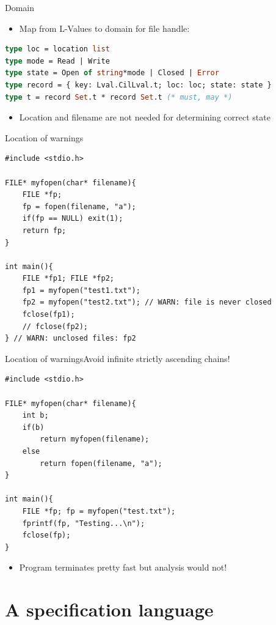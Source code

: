 \documentclass{beamer}
\begin{document}
\begin{frame}[fragile]{Domain}
\begin{itemize}
\item Map from L-Values to domain for file handle:
\end{itemize}
\begin{lstlisting}[language=ML]
type loc = location list
type mode = Read | Write
type state = Open of string*mode | Closed | Error
type record = { key: Lval.CilLval.t; loc: loc; state: state }
type t = record Set.t * record Set.t (* must, may *)
\end{lstlisting}
\begin{itemize}
\item Location and filename are not needed for determining correct state
\end{itemize}
\end{frame}

\begin{frame}[fragile]{Location of warnings}
\begin{lstlisting}
#include <stdio.h>

FILE* myfopen(char* filename){
    FILE *fp;
    fp = fopen(filename, "a");
    if(fp == NULL) exit(1);
    return fp;
}

int main(){
    FILE *fp1; FILE *fp2;
    fp1 = myfopen("test1.txt");
    fp2 = myfopen("test2.txt"); // WARN: file is never closed
    fclose(fp1);
    // fclose(fp2);
} // WARN: unclosed files: fp2
\end{lstlisting}
\end{frame}

\begin{frame}{Location of warnings}{Avoid infinite strictly ascending chains!}
\begin{lstlisting}
#include <stdio.h>

FILE* myfopen(char* filename){
    int b;
    if(b)
        return myfopen(filename);
    else
        return fopen(filename, "a");
}

int main(){
    FILE *fp; fp = myfopen("test.txt");
    fprintf(fp, "Testing...\n");
    fclose(fp);
}
\end{lstlisting}
\begin{itemize}
\item Program terminates pretty fast but analysis would not!
\end{itemize}
\end{frame}


\section{A specification language}
\end{document}

